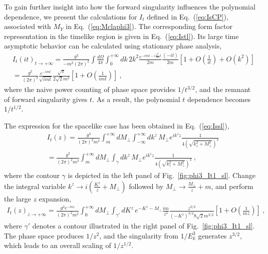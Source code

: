 \documentclass[a4paper,11pt]{article}
\begin{document}
To gain further insight into how the forward singularity influences the polynomial dependence, we present the calculations for $I_{t}$ defined in Eq.~(\ref{eq:IsCP}), associated with $M_{Y}$ in Eq.~(\ref{eq:Mclaphi3}). The corresponding form factor representation in the timelike region is given in Eq.~(\ref{eq:Istl}). Its large time asymptotic behavior can be calculated using stationary phase analysis,
\begin{align}
&I_{t}\left(i t\right)_{t\rightarrow +\infty}  = \frac{g^2}{-m^2 (2\pi)^2} \int \frac{d\Omega}{4\pi}\int_{0}^{+\infty} d k \, 2k^2 \frac{e^{-i m t - i \frac{k^2}{2m} t}}{2 m} \frac{(-i t)}{2 m} \left[1+O\left(\frac{1}{i t}\right)+O(k^2)\right] \nonumber\\
&= \frac{g^2}{(2\pi)^2}  \frac{e^{-i m t}}{\sqrt{i m t}} \frac{\sqrt{\pi}}{2 \sqrt{2} m^2} \left[1+O\left(\frac{1}{i m t}\right)\right] \ ,
\end{align}
where the naive power counting of phase space provides $1/t^{3/2}$, and the remnant of forward singularity gives $t$. As a result, the polynomial $t$ dependence becomes $1/t^{1/2}$. 

The expression for the spacelike case has been obtained in Eq.~(\ref{eq:Issl}), 
\begin{align}
&I_{t}\left(z\right)   =  \frac{g^2}{(2\pi)^2 m^2} \int_{m}^{+\infty} d M_{\perp} \int_{-\infty}^{+\infty} d k^z \, M_{\perp} e^{i k^z z}  \frac{1}{4 \left(\sqrt{k_z^2+M_{\perp}^2}\right)^3} \nonumber\\
&=\frac{g^2}{(2\pi)^2 m^2} \int_{m}^{+\infty} d M_{\perp} \int_{\gamma} d k^z \, M_{\perp} e^{i k^z z}  \frac{1}{4 \left(\sqrt{k_z^2+M_{\perp}^2}\right)^3} \ ,
\end{align}
where the contour $\gamma$ is depicted in the left panel of Fig.~\ref{fig:phi3_It1_sl}. Change the integral variable $k^z \rightarrow i \left( \frac{K^z}{z} + M_{\perp}\right)$ followed by $M_{\perp} \rightarrow \frac{M_{\perp}}{z} + m$, and perform the large $z$ expansion,
\begin{align}
I_{t}\left(z\right)_{z\rightarrow+\infty} =  \frac{g^2 e^{-m z}}{(2\pi)^2 m^2} \int_{0}^{+\infty} d M_{\perp} \int_{\gamma'} d K^z \, e^{-K^z-M_{\perp}} \frac{i m}{z^2} \frac{z^{3/2}}{\left(-K^z\right)^{3/2} 8 \sqrt{2}m^{3/2}} \left[1+O\left(\frac{1}{m z}\right)\right] \ ,
\end{align}
where $\gamma'$ denotes a contour illustrated in the right panel of Fig.~\ref{fig:phi3_It1_sl}. The phase space produces $1/z^2$, and the singularity from $1/E_k^3$ generates $z^{3/2}$, which leads to an overall scaling of $1/z^{1/2}$. 
\end{document}
